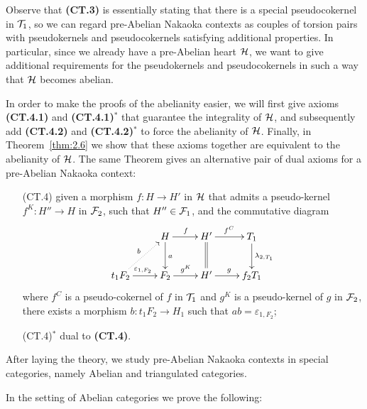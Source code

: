 Observe that \textbf{(CT.3)} is essentially stating that there is a special pseudocokernel in $\mathcal{T}_1$, so we can regard pre-Abelian Nakaoka contexts as couples of torsion pairs with pseudokernels and pseudocokernels satisfying additional properties. In particular, since we already have a pre-Abelian heart $\mathcal{H}$, we want to give additional requirements for the pseudokernels and pseudocokernels in such a way that $\mathcal{H}$ becomes abelian.

In order to make the proofs of the abelianity easier, we will first give axioms \textbf{(CT.4.1)} and \textbf{(CT.4.1)$^\ast$} that guarantee the integrality of $\mathcal{H}$, and subsequently add \textbf{(CT.4.2)} and \textbf{(CT.4.2)$^\ast$} to force the abelianity of $\mathcal{H}$. Finally, in Theorem~\ref{thm:2.6} we show that these axioms together are equivalent to the abelianity of $\mathcal{H}$. The same Theorem gives an alternative pair of dual axioms for a pre-Abelian Nakaoka context:
\begin{enumerate}
  \item[(CT.4)] given a morphism $f\colon H\to H'$ in $\mathcal{H}$ that admits a pseudo-kernel $f^K\colon H''\to H$ in $\mathcal{F}_2$, such that $H''\in \mathcal{F}_1$, and the commutative diagram
    \begin{equation*}
      \xymatrix{
        & H\ar[d]^{a}\ar[r]^{f} & H'\ar@{=}[d]\ar[r]^{f^C} & T_1\ar[d]^{\lambda_{2,T_1}}\\
        t_1F_2\ar@{.>}[ur]^{b}\ar[r]^{\varepsilon_{1,F_2}} & F_2\ar[r]^{g^K} & H'\ar[r]^{g} & f_2T_1
      }
    \end{equation*}
    where $f^C$  is a pseudo-cokernel of $f$ in $\mathcal{T}_1$ and $g^K$ is a pseudo-kernel of $g$ in $\mathcal{F}_2$, there exists a morphism $b\colon t_1F_2\to H_1$ such that $ab=\varepsilon_{1,F_2}$;
  \item[(CT.4)$^\ast$] dual to \textbf{(CT.4)}.
\end{enumerate}

After laying the theory, we study pre-Abelian Nakaoka contexts in special categories, namely Abelian and triangulated categories.

In the setting of Abelian categories we prove the following:

